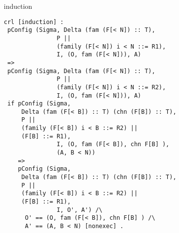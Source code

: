 \documentclass{article}
\begin{document}
\begin{itemize}
%
%

\item[induction]

\begin{lstlisting}
crl [induction] : 
 pConfig (Sigma, Delta (fam (F[< N]) :: T), 
               P || 
               (family (F[< N]) i < N ::= R1),
               I, (O, fam (F[< N])), A)
 =>                
 pConfig (Sigma, Delta (fam (F[< N]) :: T), 
               P || 
               (family (F[< N]) i < N ::= R2),
               I, (O, fam (F[< N])), A)
 if pConfig (Sigma, 
     Delta (fam (F[< B]) :: T) (chn (F[B]) :: T), 
     P || 
     (family (F[< B]) i < B ::= R2) ||
     (F[B] ::= R1),
               I, (O, fam (F[< B]), chn F[B] ), 
               (A, B < N))
    =>            
    pConfig (Sigma, 
     Delta (fam (F[< B]) :: T) (chn (F[B]) :: T), 
     P || 
     (family (F[< B]) i < B ::= R2) ||
     (F[B] ::= R1),
               I, O', A') /\ 
      O' == (O, fam (F[< B]), chn F[B] ) /\ 
      A' == (A, B < N) [nonexec] .
\end{lstlisting}


\end{itemize}
\end{document}
